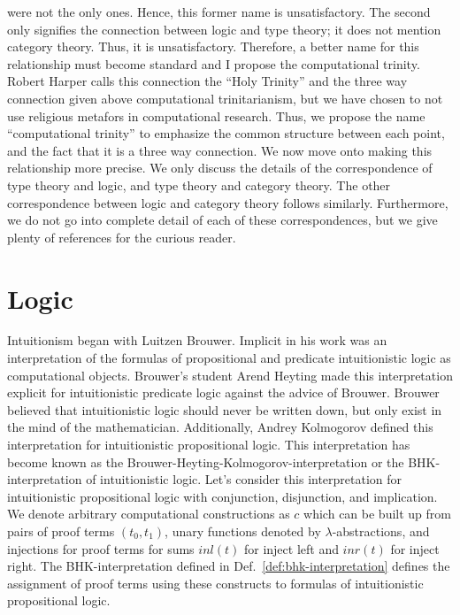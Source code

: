 were not the only ones.  Hence, this former name is
unsatisfactory. The second only signifies the connection between logic
and type theory; it does not mention category theory.  Thus, it is
unsatisfactory.  Therefore, a better name for this relationship must
become standard and I propose the computational trinity.  Robert
Harper calls this connection the ``Holy Trinity''
and the three way connection given above computational trinitarianism,
but we have chosen to not use religious metafors in computational
research.  Thus, we propose the name ``computational trinity'' to
emphasize the common structure between each point, and the fact that
it is a three way connection.  We now move onto making this
relationship more precise.  We only discuss the details of the
correspondence of type theory and logic, and type theory and category
theory.  The other correspondence between logic and category theory
follows similarly. Furthermore, we do not go into complete detail of
each of these correspondences, but we give plenty of references for
the curious reader.

\section{Logic}
\label{sec:type_theory_logic}
Intuitionism began with Luitzen Brouwer.  Implicit
in his work was an interpretation of the formulas of propositional and
predicate intuitionistic logic as computational objects.  Brouwer's
student Arend Heyting made this interpretation explicit for
intuitionistic predicate logic against the advice of Brouwer.  Brouwer
believed that intuitionistic logic should never be written down, but
only exist in the mind of the mathematician.  Additionally, Andrey
Kolmogorov defined this interpretation for intuitionistic
propositional logic.  This interpretation has become known as the
Brouwer-Heyting-Kolmogorov-interpretation or the
BHK-interpretation of intuitionistic logic.
Let's consider this interpretation for intuitionistic propositional
logic with conjunction, disjunction, and implication.  We denote
arbitrary computational constructions as $c$ which can be built up
from pairs of proof terms $(t_0,t_1)$, unary functions denoted by
$\lambda$-abstractions, and injections for proof terms for sums
$inl(t)$ for inject left and $inr(t)$ for inject right.  The
BHK-interpretation defined in Def.~\ref{def:bhk-interpretation}
defines the assignment of proof terms using these constructs to
formulas of intuitionistic propositional logic.


